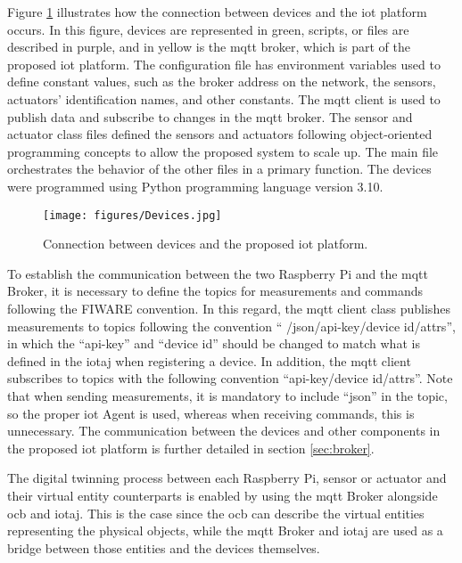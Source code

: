 \documentclass[preprint, review, 12pt]{elsarticle}
\begin{document}
Figure \ref{fig:devices} illustrates how the connection between devices and the \gls{iot} platform occurs. In this figure, devices are represented in green, scripts, or files are described in purple, and in yellow is the \gls{mqtt} broker, which is part of the proposed \gls{iot} platform. The configuration file has environment variables used to define constant values, such as the broker address on the network, the sensors, actuators' identification names, and other constants. The \gls{mqtt} client is used to publish data and subscribe to changes in the \gls{mqtt} broker. The sensor and actuator class files defined the sensors and actuators following object-oriented programming concepts to allow the proposed system to scale up. The main file orchestrates the behavior of the other files in a primary function. The devices were programmed using Python programming language version 3.10. 
\begin{figure}[htbp]
    \centering
    \texttt{[image: figures/Devices.jpg]}
    \caption{Connection between devices and the proposed \gls{iot} platform.}
    \label{fig:devices}
\end{figure}

To establish the communication between the two Raspberry Pi and the \gls{mqtt} Broker, it is necessary to define the topics for measurements and commands following the FIWARE convention. In this regard, the \gls{mqtt} client class publishes measurements to topics following the convention `` /json/api-key/device id/attrs'', in which the ``api-key'' and ``device id'' should be changed to match what is defined in the \gls{iotaj} when registering a device. In addition, the \gls{mqtt} client subscribes to topics with the following convention ``api-key/device id/attrs''. Note that when sending measurements, it is mandatory to include ``json'' in the topic, so the proper \gls{iot} Agent is used, whereas when receiving commands, this is unnecessary. The communication between the devices and other components in the proposed \gls{iot} platform is further detailed in section \ref{sec:broker}.

The digital twinning process between each Raspberry Pi, sensor or actuator and their virtual entity counterparts is enabled by using the \gls{mqtt} Broker alongside \gls{ocb} and \gls{iotaj}. This is the case since the \gls{ocb} can describe the virtual entities representing the physical objects, while the \gls{mqtt} Broker and \gls{iotaj} are used as a bridge between those entities and the devices themselves. 
\end{document}

